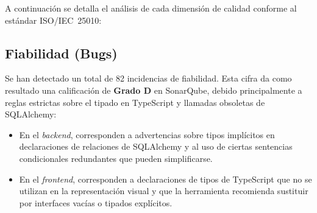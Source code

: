 A continuación se detalla el análisis de cada dimensión de calidad conforme al estándar \ac{ISO}/\ac{IEC}~25010:

\subsection{Fiabilidad (Bugs)}
Se han detectado un total de 82 incidencias de fiabilidad. Esta cifra da como resultado una calificación de \textbf{Grado D} en SonarQube, debido principalmente a reglas estrictas sobre el tipado en TypeScript y llamadas obsoletas de SQLAlchemy:
\begin{itemize}
  \item En el \emph{backend}, corresponden a advertencias sobre tipos implícitos en declaraciones de relaciones de SQLAlchemy y al uso de ciertas sentencias condicionales redundantes que pueden simplificarse.
  \item En el \emph{frontend}, corresponden a declaraciones de tipos de TypeScript que no se utilizan en la representación visual y que la herramienta recomienda sustituir por interfaces vacías o tipados explícitos.
\end{itemize}

